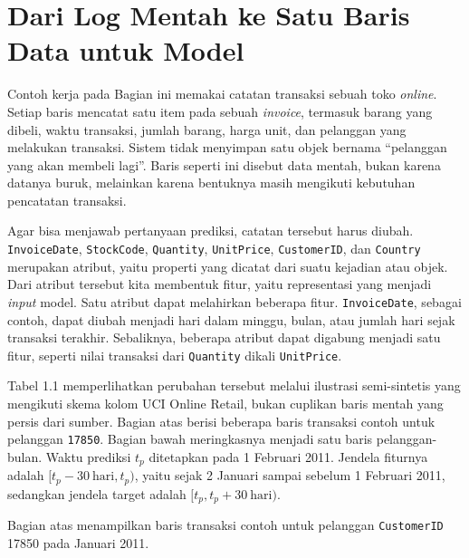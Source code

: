 \section{Dari Log Mentah ke Satu Baris Data untuk Model}\label{dari-log-mentah-ke-satu-baris-data-untuk-model}

Contoh kerja pada Bagian ini memakai catatan transaksi sebuah toko \emph{online}. Setiap baris mencatat satu item pada sebuah \emph{invoice}, termasuk barang yang dibeli, waktu transaksi, jumlah barang, harga unit, dan pelanggan yang melakukan transaksi. Sistem tidak menyimpan satu objek bernama ``pelanggan yang akan membeli lagi''. Baris seperti ini disebut data mentah, bukan karena datanya buruk, melainkan karena bentuknya masih mengikuti kebutuhan pencatatan transaksi.

Agar bisa menjawab pertanyaan prediksi, catatan tersebut harus diubah. \passthrough{\lstinline!InvoiceDate!}, \passthrough{\lstinline!StockCode!}, \passthrough{\lstinline!Quantity!}, \passthrough{\lstinline!UnitPrice!}, \passthrough{\lstinline!CustomerID!}, dan \passthrough{\lstinline!Country!} merupakan atribut, yaitu properti yang dicatat dari suatu kejadian atau objek. Dari atribut tersebut kita membentuk fitur, yaitu representasi yang menjadi \emph{input} model. Satu atribut dapat melahirkan beberapa fitur. \passthrough{\lstinline!InvoiceDate!}, sebagai contoh, dapat diubah menjadi hari dalam minggu, bulan, atau jumlah hari sejak transaksi terakhir. Sebaliknya, beberapa atribut dapat digabung menjadi satu fitur, seperti nilai transaksi dari \passthrough{\lstinline!Quantity!} dikali \passthrough{\lstinline!UnitPrice!}.

Tabel 1.1 memperlihatkan perubahan tersebut melalui ilustrasi semi-sintetis yang mengikuti skema kolom UCI Online Retail, bukan cuplikan baris mentah yang persis dari sumber. Bagian atas berisi beberapa baris transaksi contoh untuk pelanggan \passthrough{\lstinline!17850!}. Bagian bawah meringkasnya menjadi satu baris pelanggan-bulan. Waktu prediksi \(t_p\) ditetapkan pada 1 Februari 2011. Jendela fiturnya adalah \([t_p-30\ \text{hari}, t_p)\), yaitu sejak 2 Januari sampai sebelum 1 Februari 2011, sedangkan jendela target adalah \([t_p, t_p+30\ \text{hari})\).


Bagian atas menampilkan baris transaksi contoh untuk pelanggan \passthrough{\lstinline!CustomerID!} 17850 pada Januari 2011.

